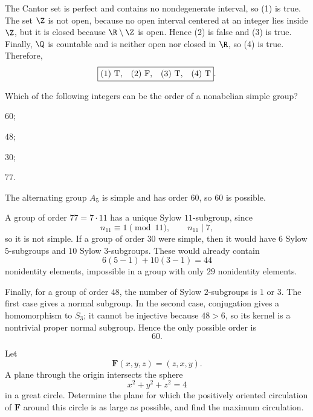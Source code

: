     \begin{solution}
        The Cantor set is perfect and contains no nondegenerate interval, so
        (1) is true. The set $\Z$ is not open, because no open interval centered
        at an integer lies inside $\Z$, but it is closed because
        $\R\setminus\Z$ is open. Hence (2) is false and (3) is true. Finally,
        $\Q$ is countable and is neither open nor closed in $\R$, so (4) is
        true. Therefore,
        \[
            \boxed{\text{(1) T,\quad (2) F,\quad (3) T,\quad (4) T}}.
        \]
    \end{solution}

    \begin{expectedproblem}
        Which of the following integers can be the order of a nonabelian simple
        group?
        \begin{problemchoices}
            \item $60$;
            \item $48$;
            \item $30$;
            \item $77$.
        \end{problemchoices}
    \end{expectedproblem}

    \begin{solution}
        The alternating group $A_5$ is simple and has order $60$, so $60$ is
        possible.

        A group of order $77=7\cdot11$ has a unique Sylow $11$-subgroup, since
        \[
            n_{11}\equiv1\pmod{11},
            \qquad
            n_{11}\mid7,
        \]
        so it is not simple. If a group of order $30$ were simple, then it would
        have $6$ Sylow $5$-subgroups and $10$ Sylow $3$-subgroups. These would
        already contain
        \[
            6(5-1)+10(3-1)=44
        \]
        nonidentity elements, impossible in a group with only $29$
        nonidentity elements.

        Finally, for a group of order $48$, the number of Sylow $2$-subgroups
        is $1$ or $3$. The first case gives a normal subgroup. In the second
        case, conjugation gives a homomorphism to $S_3$; it cannot be injective
        because $48>6$, so its kernel is a nontrivial proper normal subgroup.
        Hence the only possible order is
        \[
            \boxed{60}.
        \]
    \end{solution}

    \begin{expectedproblem}
        Let
        \[
            \mathbf{F}(x,y,z)=(z,x,y).
        \]
        A plane through the origin intersects the sphere
        \[
            x^2+y^2+z^2=4
        \]
        in a great circle. Determine the plane for which the positively
        oriented circulation of $\mathbf{F}$ around this circle is as large as
        possible, and find the maximum circulation.
    \end{expectedproblem}

